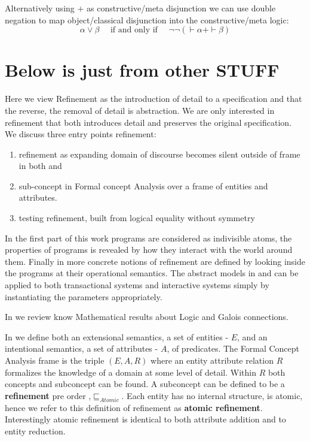 Alternatively \cite[Section 5]{ConstructClassical}  using $+$ as constructive/meta disjunction we can use double negation to map object/classical disjunction into the constructive/meta logic:
\[ \alpha \vee  \beta \quad \text{ if and only if } \quad \neg \neg (\vdash \alpha + \vdash \beta ) \]
 
 






\section{Below is just from other STUFF }\label{sec:xintro}
Here we view Refinement as the introduction of detail to a specification and that the reverse, the removal of detail is abstraction. We are only interested in refinement that both introduces detail and preserves the original specification. We discuss three entry points refinement:
\begin{enumerate}
\item refinement as expanding domain of discourse   becomes silent outside of frame in both  and  

\item sub-concept  in Formal concept Analysis over a frame of entities and  attributes.
\item testing refinement,  built from logical equality without symmetry
 \end{enumerate}
 
In the first part of this work programs are considered as indivisible atoms, the properties of programs is revealed by how they interact with the world around them. Finally in   more concrete notions of refinement  are defined by looking inside the programs at their  operational semantics. The abstract models in  and  can be applied to both transactional systems and interactive systems simply by instantiating the parameters appropriately.

In  we review know Mathematical results about Logic and Galois connections.

In  we define both an  extensional semantics, a set of entities - $E$,  and an intentional semantics, a set of attributes - $A$, of predicates. The Formal Concept Analysis frame is the triple $(E,A,R)$  where an entity attribute relation $R$ formalizes the knowledge of a domain at some level of detail.  Within $R$  both concepts and subconcept   can be found.  A subconcept can be  defined to be a {\bf refinement}   pre order ,$\sqsubseteq_{Atomic}$. Each entity has no internal structure, is atomic, hence we refer to this definition of refinement as {\bf atomic refinement}. Interestingly atomic refinement is identical to both attribute addition and to entity reduction.  
 
